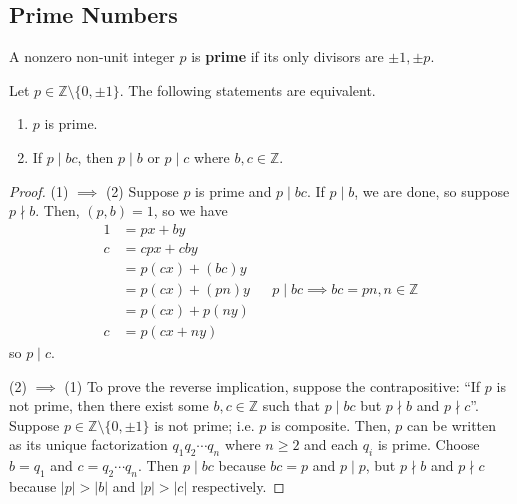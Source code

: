 \documentclass [12pt] {article}
\newcommand{\Z}{\mathbb{Z}}
\newenvironment{theorem}[1]{\begin{tcolorbox}[title={Theorem #1}]}{\end{tcolorbox}}
\newenvironment{definition}[1]{\begin{tcolorbox}[title={Definition: #1},colback=green!5!white,colframe=black!75!green]}{\end{tcolorbox}}
\renewcommand{\bf}[1]{\textbf{{#1}}}
\begin{document}
\subsection{Prime Numbers}
\begin{definition}{Prime}
    A nonzero non-unit integer $p$ is \bf{prime} if its only divisors are $\pm 1, \pm p$.
\end{definition}
 
\begin{theorem}{}
    Let $p \in \Z \setminus \{0, \pm 1\}$. The following statements are equivalent.
    \begin{enumerate}[label=(\arabic*)]
        \item $p$ is prime.
        \item If $p \mid bc$, then $p \mid b$ or $p \mid c$ where $b, c \in \Z$.
    \end{enumerate}
\end{theorem}
\begin{proof}
    (1) $\implies$ (2)
    Suppose $p$ is prime and $p \mid bc$. If $p \mid b$, we are done, so suppose $p \nmid b$. Then,
    $(p, b) = 1$, so we have
    \begin{align*}
        1 &= px + by \\ 
        c &= cpx + cby \\
          &= p(cx) + (bc)y \\
          &= p(cx) + (pn)y && p \mid bc \implies bc = pn, n \in \Z \\
          &= p(cx) + p(ny) \\
        c &= p(cx + ny)
    \end{align*}
    so $p \mid c$.
    \vspace{0.5em}

    (2) $\implies$ (1) 
    To prove the reverse implication, suppose the contrapositive: ``If $p$ is not prime, then there
    exist some $b, c \in \Z$ such that $p \mid bc$ but $p \nmid b$ and $p \nmid c$''. Suppose 
    $p \in \Z \setminus \{ 0, \pm 1 \}$ is not prime; i.e. $p$ is composite. Then, $p$ can be
    written as its unique factorization $q_1 q_2 \cdots q_n$ where $n \geq 2$ and each $q_i$ is
    prime. Choose $b = q_1$ and $c = q_2 \cdots q_n$. Then $p \mid bc$ because $bc = p$ and 
    $p \mid p$, but $p \nmid b$ and $p \nmid c$ because $|p| > |b|$ and $|p| > |c|$ respectively.
\end{proof}
\end{document}
